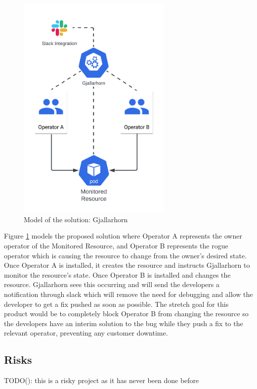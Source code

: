 \documentclass{article}
\begin{document}
\begin{figure}[!hb]
    \centering
    \includegraphics[width=75mm]{./resources/solution-model.png}
    \caption{Model of the solution: Gjallarhorn}
    \label{solution-model}
\end{figure}

Figure \ref{solution-model} models the proposed solution where Operator A represents the owner operator of the Monitored Resource, and Operator B represents the rogue operator which is causing the resource to change from the owner’s desired state. 
Once Operator A is installed, it creates the resource and instructs Gjallarhorn to monitor the resource’s state. 
Once Operator B is installed and changes the resource. 
Gjallarhorn sees this occurring and will send the developers a notification through slack which will remove the need for debugging and allow the developer to get a fix pushed as soon as possible. 
The stretch goal for this product would be to completely block Operator B from changing the resource so the developers have an interim solution to the bug while they push a fix to the relevant operator, preventing any customer downtime.


\subsection{Risks}
TODO(): this is a risky project as it has never been done before 
\end{document}

